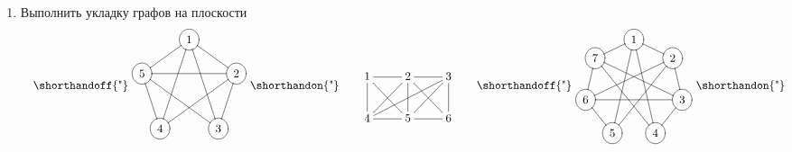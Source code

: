 \begin{enumerate}
    \item Выполнить укладку графов на плоскости
    \[
        \begin{tabular}{ccc}
            {
                \shorthandoff{"}
                \begin{xy}
                    \POS (0.00,15.00)*++[o][F-]{1}="a1"
                    \POS (14.27,4.64)*++[o][F-]{2}="b1"
                    \POS (8.82,-12.14)*++[o][F-]{3}="c1"
                    \POS (-8.82,-12.14)*++[o][F-]{4}="d1"
                    \POS (-14.27,4.64)*++[o][F-]{5}="e1"
                    \POS"a1" \ar @{-} "b1"
                    \POS"a1" \ar @{-} "c1"
                    \POS"a1" \ar @{-} "d1"
                    \POS"a1" \ar @{-} "e1"
                    \POS"b1" \ar @{-} "c1"
                    \POS"b1" \ar @{-} "d1"
                    \POS"b1" \ar @{-} "e1"
                    \POS"c1" \ar @{-} "e1"
                    \POS"d1" \ar @{-} "e1"
                \end{xy}        
                \shorthandon{"}            
            }        
            &
            \raisebox{1.5\height}{
                {\xymatrix{
                    1 \ar@{-}[d] \ar@{-}[dr] \ar@{-}[r]
                        &2 \ar@{-}[dl] \ar@{-}[d] \ar@{-}[dr] \ar@{-}[r]
                            &3 \ar@{-}[dll] \ar@{-}[dl] \ar@{-}[d]
                                \\
                    4 \ar@{-}[r]
                        &5 \ar@{-}[r]
                            &6                        
                }}
            }
            &
            {
                \shorthandoff{"}
                \begin{xy}
                    \POS (0.00,15.00)*++[o][F-]{1}="a2"
                    \POS (11.73,9.35)*++[o][F-]{2}="b2"
                    \POS (14.62,-3.34)*++[o][F-]{3}="c2"
                    \POS (6.51,-13.51)*++[o][F-]{4}="d2"
                    \POS (-6.51,-13.51)*++[o][F-]{5}="e2"
                    \POS (-14.62,-3.34)*++[o][F-]{6}="f2"
                    \POS (-11.73,9.35)*++[o][F-]{7}="g2"
                    \POS"a2" \ar @{-} "b2"
                    \POS"a2" \ar @{-} "d2"
                    \POS"b2" \ar @{-} "c2"
                    \POS"b2" \ar @{-} "e2"
                    \POS"c2" \ar @{-} "d2"
                    \POS"c2" \ar @{-} "f2"
                    \POS"d2" \ar @{-} "g2"
                    \POS"e2" \ar @{-} "f2"
                    \POS"e2" \ar @{-} "a2"
                    \POS"f2" \ar @{-} "g2"
                    \POS"f2" \ar @{-} "b2"
                    \POS"g2" \ar @{-} "a2"
                    \POS"g2" \ar @{-} "c2" 
                \end{xy}
                \shorthandon{"}
            }
        \end{tabular}
    \]
    

\end{enumerate}
